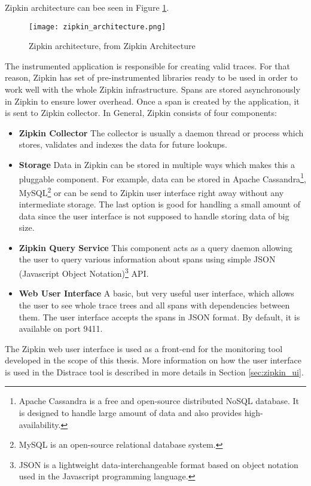 Zipkin architecture can bee seen in Figure \ref{fig:zipkin_architecture}.
\begin{figure}
	\centering
	\texttt{[image: zipkin\_architecture.png]}
	\caption{Zipkin architecture, from Zipkin Architecture \cite{ZipkinImage}}
	\label{fig:zipkin_architecture}
\end{figure}
The instrumented application is responsible for creating valid traces. For that reason, Zipkin has set of pre-instrumented libraries ready to be used in order to work well with the whole Zipkin infrastructure. Spans are stored asynchronously in Zipkin to ensure lower overhead. Once a span is created by the application, it is sent to Zipkin collector. In General, Zipkin consists of four components:
\begin{itemize}
	\item \textbf{Zipkin Collector} \newline
	The collector is usually a daemon thread or process which stores, validates and indexes the data for future lookups.
	\item\textbf{Storage} \newline
	Data in Zipkin can be stored in multiple ways which makes this a pluggable component. For example, data can be stored in Apache Cassandra\footnote{Apache Cassandra is a free and open-source distributed NoSQL database. It is designed to handle large amount of data and also provides high-availability.}, MySQL\footnote{MySQL is an open-source relational database system.} or can be send to Zipkin user interface right away without any intermediate storage. The last option is good for handling a small amount of data since the user interface is not supposed to handle storing data of big size.
	\item \textbf{Zipkin Query Service} \newline
	This component acts as a query daemon allowing the user to query various information about spans using simple JSON (Javascript Object Notation)\footnote{JSON is a lightweight data-interchangeable format based on object notation used in the Javascript programming language.} API.
	\item \textbf{Web User Interface} \newline
	A basic, but very useful user interface, which allows the user to see whole trace trees and all spans with dependencies between them. The user interface accepts the spans in JSON format. By default, it is available on port 9411.
\end{itemize}
The Zipkin web user interface is used as a front-end for the monitoring tool developed in the scope of this thesis. More information on how the user interface is used in the Distrace tool is described in more details in Section \ref{sec:zipkin_ui}.
